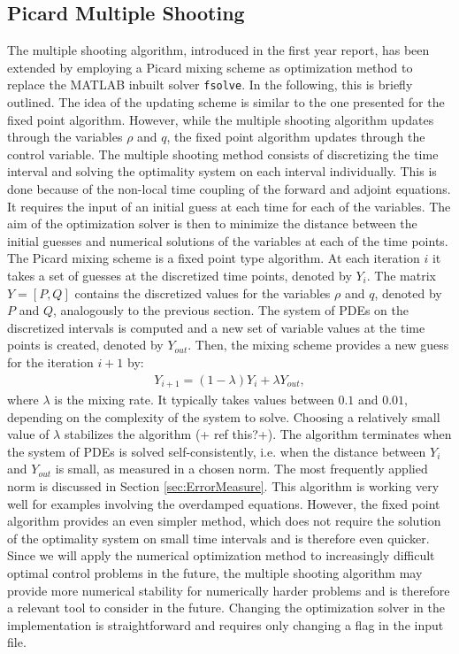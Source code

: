 \documentclass[11pt, a4paper]{article}
\theoremstyle{definition}
\begin{document}
\subsection{Picard Multiple Shooting}

The multiple shooting algorithm, introduced in the first year report, has been extended by employing a Picard mixing scheme as optimization method to replace the {\scshape MATLAB} inbuilt solver \texttt{fsolve}. In the following, this is briefly outlined.
The idea of the updating scheme is similar to the one presented for the fixed point algorithm. However, while the multiple shooting algorithm updates through the variables $\rho$ and $q$, the fixed point algorithm updates through the control variable.
The multiple shooting method consists of discretizing the time interval and solving the optimality system on each interval individually. This is done because of the non-local time coupling of the forward and adjoint equations. It requires the input of an initial guess at each time for each of the variables. The aim of the optimization solver is then to minimize the distance between the initial guesses and numerical solutions of the variables at each of the time points. \\
The Picard mixing scheme is a fixed point type algorithm. At each iteration $i$ it takes a set of guesses at the discretized time points, denoted by $Y_i$. The matrix $Y = [P,Q]$ contains the discretized values for the variables $\rho$ and $q$, denoted by $P$ and $Q$, analogously to the previous section.  
The system of PDEs on the discretized intervals is computed and a new set of variable values at the time points is created, denoted by $Y_{out}$. Then, the mixing scheme provides a new guess for the iteration $i+1$ by:
\begin{align*}
Y_{i+1} = (1 - \lambda)Y_i + \lambda Y_{out},
\end{align*}
where $\lambda$ is the mixing rate. It typically takes values between $0.1$ and $0.01$, depending on the complexity of the system to solve. Choosing a relatively small value of $\lambda$ stabilizes the algorithm (+ ref this?+). 
The algorithm terminates when the system of PDEs is solved self-consistently, i.e. when the distance between $Y_i$ and $Y_{out}$ is small, as measured in a chosen norm. The most frequently applied norm is discussed in Section \ref{sec:ErrorMeasure}.
This algorithm is working very well for examples involving the overdamped equations. However, the fixed point algorithm provides an even simpler method, which does not require the solution of the optimality system on small time intervals and is therefore even quicker. Since we will apply the numerical optimization method to increasingly difficult optimal control problems in the future, the multiple shooting algorithm may provide more numerical stability for numerically harder problems and is therefore a relevant tool to consider in the future. Changing the optimization solver in the implementation is straightforward and requires only changing a flag in the input file.
\end{document}
